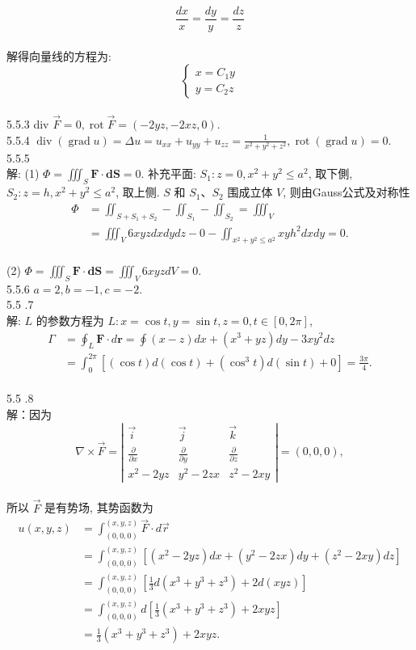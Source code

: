 \documentclass[a4paper,11pt,UTF8]{article}
\begin{document}
$$
\frac{d x}{x}=\frac{d y}{y}=\frac{d z}{z}
$$\\
解得向量线的方程为:
$$
\left\{\begin{array}{l}
	x=C_1 y \\
	y=C_2 z
\end{array}\right.
$$\\
5.5.3 div $\vec{F}=0, \operatorname{rot} \vec{F}=(-2 y z,-2 x z, 0)$.\\
5.5.4 $\operatorname{div}(\operatorname{grad} u)=\Delta u=u_{x x}+u_{y y}+u_{z z}=\frac{1}{x^2+y^2+z^2}, \operatorname{rot}(\operatorname{grad} u)=0$.\\
5.5.5\\
解: (1) $\Phi=\iiint_S \mathbf{F} \cdot \mathbf{d S}=0$.
补充平面: $S_1: z=0, x^2+y^2 \leq a^2$, 取下側, $S_2: z=h, x^2+y^2 \leq a^2$, 取上侧. $S$ 和 $S_1 、 S_2$ 围成立体 $V$, 则由Gauss公式及对称性
$$
\begin{aligned}
	\Phi & =\iint_{S+S_1+S_2}-\iint_{S_1}-\iint_{S_2}=\iiint_V \\
	& =\iiint_V 6 x y z d x d y d z-0-\iint_{x^2+y^2 \leq a^2} x y h^2 d x d y=0 .
\end{aligned}
$$\\
(2) $\Phi=\iiint_S \mathbf{F} \cdot \mathbf{d} \mathbf{S}=\iiint_V 6 x y z d V=0$.\\
5.5.6 $a=2, b=-1, c=-2$.\\
5.5 .7\\
解: $L$ 的参数方程为 $L: x=\cos t, y=\sin t, z=0, t \in[0,2 \pi]$,
$$
\begin{aligned}
	\Gamma & =\oint_L \mathbf{F} \cdot d \mathbf{r}=\oint(x-z) d x+\left(x^3+y z\right) d y-3 x y^2 d z \\
	& =\int_0^{2 \pi}\left[(\cos t) d(\cos t)+\left(\cos ^3 t\right) d(\sin t)+0\right]=\frac{3 \pi}{4} .
\end{aligned}
$$\\
5.5 .8\\
解：因为
$$
\nabla \times \vec{F}=\left|\begin{array}{ccc}
	\vec{i} & \vec{j} & \vec{k} \\
	\frac{\partial}{\partial x} & \frac{\partial}{\partial y} & \frac{\partial}{\partial z} \\
	x^2-2 y z & y^2-2 z x & z^2-2 x y
\end{array}\right|=(0,0,0),
$$\\
所以 $\vec{F}$ 是有势场, 其势函数为
$$
\begin{aligned}
	u(x, y, z) & =\int_{(0,0,0)}^{(x, y, z)} \vec{F} \cdot d \vec{r} \\
	& =\int_{(0,0,0)}^{(x, y, z)}\left[\left(x^2-2 y z\right) d x+\left(y^2-2 z x\right) d y+\left(z^2-2 x y\right) d z\right]\\
	& =\int_{(0,0,0)}^{(x, y, z)}\left[\frac{1}{3} d\left(x^3+y^3+z^3\right)+2 d(x y z)\right] \\
	& =\int_{(0,0,0)}^{(x, y, z)} d\left[\frac{1}{3}\left(x^3+y^3+z^3\right)+2 x y z\right] \\
	& =\frac{1}{3}\left(x^3+y^3+z^3\right)+2 x y z .
\end{aligned}
$$\\
\end{document}
